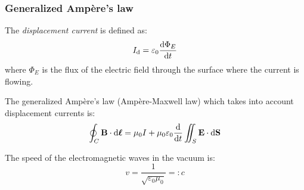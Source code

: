 \documentclass[../../../main.tex]{subfiles}
\begin{document}
\begin{multicols}{2}
  \subsubsection{Generalized Ampère's law}
  \begin{definition}
    The \textit{displacement current} is defined as: $$I_\text{d}=\varepsilon_0\dv{\Phi_E}{t}$$ where $\Phi_E$ is the flux of the electric field through the surface where the current is flowing.
  \end{definition}
  \begin{law}
    The generalized Ampère's law (Ampère-Maxwell law) which takes into account displacement currents is: $$\oint_C\boldsymbol{\mathrm{B}}\cdot \dd\boldsymbol{\mathrm{\ell}}=\mu_0 I+\mu_0\varepsilon_0\dv{}{t}\iint_S\boldsymbol{\mathrm{E}}\cdot \dd\boldsymbol{\mathrm{S}}$$
  \end{law}
  \begin{definition}
    The speed of the electromagnetic waves in the vacuum is: $$v=\frac{1}{\sqrt{\varepsilon_0\mu_0}}=:c$$
  \end{definition}
\end{multicols}
\end{document}

